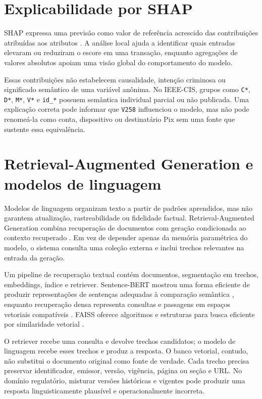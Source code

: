 \section{Explicabilidade por SHAP}

SHAP expressa uma previsão como valor de referência acrescido das contribuições atribuídas aos atributos \cite{lundberg2017unified}. A análise local ajuda a identificar quais entradas elevaram ou reduziram o escore em uma transação, enquanto agregações de valores absolutos apoiam uma visão global do comportamento do modelo.

Essas contribuições não estabelecem causalidade, intenção criminosa ou significado semântico de uma variável anônima. No IEEE-CIS, grupos como \texttt{C*}, \texttt{D*}, \texttt{M*}, \texttt{V*} e \texttt{id\_*} possuem semântica individual parcial ou não publicada. Uma explicação correta pode informar que \texttt{V258} influenciou o modelo, mas não pode renomeá-la como conta, dispositivo ou destinatário Pix sem uma fonte que sustente essa equivalência.

\section{Retrieval-Augmented Generation e modelos de linguagem}

Modelos de linguagem organizam texto a partir de padrões aprendidos, mas não garantem atualização, rastreabilidade ou fidelidade factual. Retrieval-Augmented Generation combina recuperação de documentos com geração condicionada ao contexto recuperado \cite{lewis2020rag}. Em vez de depender apenas da memória paramétrica do modelo, o sistema consulta uma coleção externa e inclui trechos relevantes na entrada da geração.

Um pipeline de recuperação textual contém documentos, segmentação em trechos, embeddings, índice e retriever. Sentence-BERT mostrou uma forma eficiente de produzir representações de sentenças adequadas à comparação semântica \cite{reimers2019sentencebert}, enquanto recuperação densa representa consultas e passagens em espaços vetoriais compatíveis \cite{karpukhin2020dense}. FAISS oferece algoritmos e estruturas para busca eficiente por similaridade vetorial \cite{johnson2021billion}.

O retriever recebe uma consulta e devolve trechos candidatos; o modelo de linguagem recebe esses trechos e produz a resposta. O banco vetorial, contudo, não substitui o documento original como fonte de verdade. Cada trecho precisa preservar identificador, emissor, versão, vigência, página ou seção e URL. No domínio regulatório, misturar versões históricas e vigentes pode produzir uma resposta linguisticamente plausível e operacionalmente incorreta.

